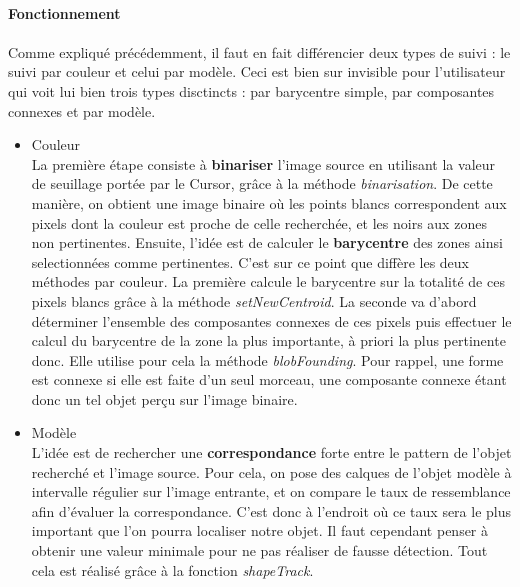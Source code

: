\documentclass{report}
\begin{document}
						\paragraph{Fonctionnement}\paragraph{}
						Comme expliqué précédemment, il faut en fait différencier deux types de suivi : le suivi par couleur et celui par modèle. Ceci est bien sur invisible pour l'utilisateur qui voit lui bien trois types disctincts : par barycentre simple, par composantes connexes et par modèle.\\
						\begin{itemize}
							\item{\textcolor{vert}{Couleur}}\\
							La première étape consiste à \textbf{binariser} l'image source en utilisant la valeur de seuillage portée par le Cursor, grâce à la méthode \textit{binarisation}. De cette manière, on obtient une image binaire où les points blancs correspondent aux pixels dont la couleur est proche de celle recherchée, et les noirs aux zones non pertinentes. Ensuite, l'idée est de calculer le \textbf{barycentre} des zones ainsi selectionnées comme pertinentes. C'est sur ce point que diffère les deux méthodes par couleur. La première calcule le barycentre sur la totalité de ces pixels blancs grâce à la méthode \textit{setNewCentroid}. La seconde va d'abord déterminer l'ensemble des composantes connexes de ces pixels puis effectuer le calcul du barycentre de la zone la plus importante, à priori la plus pertinente donc. Elle utilise pour cela la méthode \textit{blobFounding}.
Pour rappel, une forme est connexe si elle est faite d'un seul morceau, une composante connexe étant donc un tel objet perçu sur l'image binaire.\\
							\item{\textcolor{marron}{Modèle}}\\
							L'idée est de rechercher une \textbf{correspondance} forte entre le pattern de l'objet recherché et l'image source. Pour cela, on pose des calques de l'objet modèle à intervalle régulier sur l'image entrante, et on compare le taux de ressemblance afin d'évaluer la correspondance. C'est donc à l'endroit où ce taux sera le plus important que l'on pourra localiser notre objet. Il faut cependant penser à obtenir une valeur minimale pour ne pas réaliser de fausse détection. Tout cela est réalisé grâce à la fonction \textit{shapeTrack}.
						\end{itemize}
						\newpage
\end{document}
